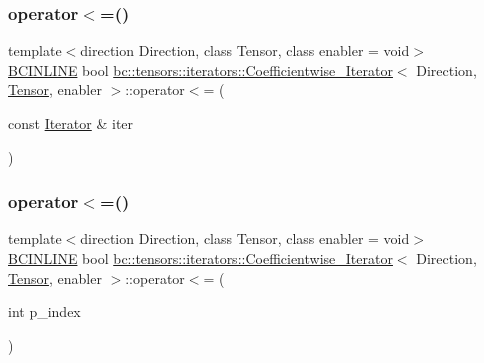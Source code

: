 \mbox{\label{structbc_1_1tensors_1_1iterators_1_1Coefficientwise__Iterator_ad5f83683471c6a514c19054952410b51}} 
\subsubsection{\texorpdfstring{operator$<$=()}{operator<=()}\hspace{0.1cm}{\footnotesize\ttfamily [1/2]}}
{\footnotesize\ttfamily template$<$direction Direction, class Tensor, class enabler = void$>$ \\
\hyperlink{common_8h_a6699e8b0449da5c0fafb878e59c1d4b1}{B\+C\+I\+N\+L\+I\+NE} bool \hyperlink{structbc_1_1tensors_1_1iterators_1_1Coefficientwise__Iterator}{bc\+::tensors\+::iterators\+::\+Coefficientwise\+\_\+\+Iterator}$<$ Direction, \hyperlink{namespacebc_a659391e47ab612be3ba6c18cf9c89159}{Tensor}, enabler $>$\+::operator$<$= (\begin{DoxyParamCaption}\item[{const \hyperlink{structbc_1_1tensors_1_1iterators_1_1Coefficientwise__Iterator_a313f76f47e60a806035279a36a84f835}{Iterator} \&}]{iter }\end{DoxyParamCaption})\hspace{0.3cm}{\ttfamily [inline]}}

\mbox{\label{structbc_1_1tensors_1_1iterators_1_1Coefficientwise__Iterator_aff0446837dda90526bddb24d9d6b7a9a}} 
\subsubsection{\texorpdfstring{operator$<$=()}{operator<=()}\hspace{0.1cm}{\footnotesize\ttfamily [2/2]}}
{\footnotesize\ttfamily template$<$direction Direction, class Tensor, class enabler = void$>$ \\
\hyperlink{common_8h_a6699e8b0449da5c0fafb878e59c1d4b1}{B\+C\+I\+N\+L\+I\+NE} bool \hyperlink{structbc_1_1tensors_1_1iterators_1_1Coefficientwise__Iterator}{bc\+::tensors\+::iterators\+::\+Coefficientwise\+\_\+\+Iterator}$<$ Direction, \hyperlink{namespacebc_a659391e47ab612be3ba6c18cf9c89159}{Tensor}, enabler $>$\+::operator$<$= (\begin{DoxyParamCaption}\item[{int}]{p\+\_\+index }\end{DoxyParamCaption})\hspace{0.3cm}{\ttfamily [inline]}}

